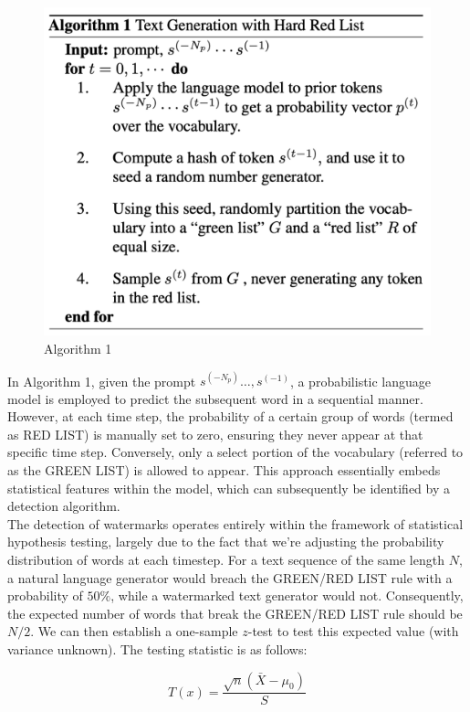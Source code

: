 \documentclass{article}
\begin{document}
\begin{figure}[H]
	\centering
	\includegraphics[width=1.0\linewidth]{images/watermark_1}
	\caption{Algorithm 1}
	\label{fig:watermark1}
\end{figure}
In Algorithm 1, given the prompt $ s^{(-N_p)}\dots, s^{(-1)} $, a probabilistic language model is employed to predict the subsequent word in a sequential manner. However, at each time step, the probability of a certain group of words (termed as RED LIST) is manually set to zero, ensuring they never appear at that specific time step. Conversely, only a select portion of the vocabulary (referred to as the GREEN LIST) is allowed to appear. This approach essentially embeds statistical features within the model, which can subsequently be identified by a detection algorithm. \\

The detection of watermarks operates entirely within the framework of statistical hypothesis testing, largely due to the fact that we're adjusting the probability distribution of words at each timestep. For a text sequence of the same length $N$, a natural language generator would breach the GREEN/RED LIST rule with a probability of $ 50\% $, while a watermarked text generator would not. Consequently, the expected number of words that break the GREEN/RED LIST rule should be $N/2$. We can then establish a one-sample $z$-test to test this expected value (with variance unknown). The testing statistic is as follows:

\begin{equation}\label{key}
	T(x) = \dfrac{\sqrt{n}\left(\bar{X} - \mu_0\right)}{S}
\end{equation}
\end{document}
